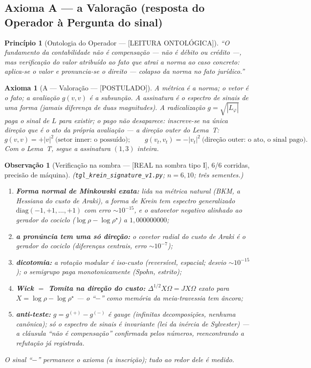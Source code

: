 \documentclass[11pt,a4paper]{article}
\newcommand{\SOMBRA}{\textsf{[REAL na sombra tipo I]}}
\newcommand{\POST}{\textsf{[POSTULADO]}}
\newcommand{\ONTO}{\textsf{[LEITURA ONTOLÓGICA]}}
\newtheorem{axiom}{Axioma}
\newtheorem{remark}{Observação}
\newtheorem{principle}{Princípio}
\begin{document}
\subsection{Axioma A --- a Valoração (resposta do Operador à Pergunta do
sinal)}
\begin{principle}[Ontologia do Operador --- \ONTO]
``O fundamento da contabilidade não é compensação --- não é débito ou
crédito ---, mas verificação do valor atribuído ao fato que atrai a norma
ao caso concreto: aplica-se o valor e pronuncia-se o direito --- colapso
da norma no fato jurídico.''
\end{principle}
\begin{axiom}[A --- Valoração --- \POST]\label{ax:A}
A métrica \emph{é} a norma; o vetor \emph{é} o fato; a avaliação
$g(v,v)$ \emph{é} a subsunção. A assinatura é o espectro de sinais de
\emph{uma} forma (jamais diferença de duas magnitudes). A radicalização
$g=\sqrt{|L_\varphi|}$ paga o sinal de $L$ para existir; o pago não
desaparece: inscreve-se na única direção que é o ato da própria avaliação
--- a direção outer do Lema~T:
\begin{equation}
g(v,v)=+|v|^2\ \text{(setor inner: o possuído)};\qquad
g(v_t,v_t)=-|v_t|^2\ \text{(direção outer: o ato, o sinal pago)}.
\end{equation}
Com o Lema~T, segue a assinatura $(1,3)$ inteira.
\end{axiom}
\begin{remark}[Verificação na sombra --- \SOMBRA, 6/6 corridas, precisão
de máquina]\label{rem:sombraA}
(\texttt{tgl\_krein\_signature\_v1.py}; $n{=}6,10$; três sementes.)
\begin{enumerate}[noitemsep]
\item \textbf{Forma normal de Minkowski exata:} lida na métrica natural
(BKM, a Hessiana do custo de Araki), a forma de Krein tem espectro
generalizado $\mathrm{diag}(-1,+1,\dots,+1)$ com erro $\sim10^{-15}$, e o
autovetor negativo alinhado ao gerador do cociclo
($\log\rho-\log\rho^\star$) a $1{,}000000000$;
\item \textbf{a pronúncia tem uma só direção:} o covetor radial do custo
de Araki é o gerador do cociclo (diferenças centrais, erro
$\sim10^{-7}$);
\item \textbf{dicotomia:} a rotação modular é iso-custo (reversível,
espacial; desvio $\sim10^{-15}$); o semigrupo paga monotonicamente
(Spohn, estrito);
\item \textbf{Wick $=$ Tomita na direção do custo:}
$\Delta^{1/2}X\Omega=JX\Omega$ exato para $X=\log\rho-\log\rho^\star$
--- o ``$-$'' como memória da meia-travessia tem âncora;
\item \textbf{anti-teste:} $g=g^{(+)}-g^{(-)}$ é gauge (infinitas
decomposições, nenhuma canônica); só o espectro de sinais é invariante
(lei da inércia de Sylvester) --- a cláusula ``não é compensação''
confirmada pelos números, reencontrando a refutação já registrada.
\end{enumerate}
O sinal ``$-$'' permanece o axioma (a inscrição); tudo ao redor dele é
medido.
\end{remark}
\end{document}
